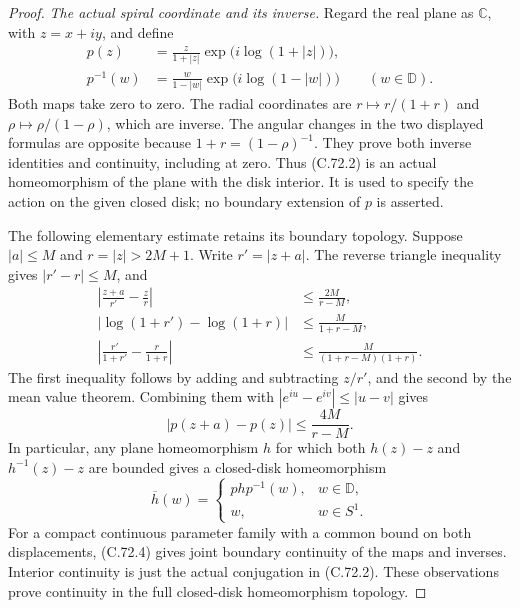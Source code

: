 \begin{proof}
\emph{The actual spiral coordinate and its inverse.}
Regard the real plane as $\mathbb C$, with
$z=x+iy$, and define
\[
 \begin{split}
 p(z)&=\frac{z}{1+|z|}
                \exp\bigl(i\log(1+|z|)\bigr),\\
 p^{-1}(w)&=\frac{w}{1-|w|}
                \exp\bigl(i\log(1-|w|)\bigr)
                            \qquad(w\in\mathbb D).
 \end{split}                                                   \tag{C.72.2}
\]
Both maps take zero to zero. The radial coordinates
are $r\mapsto r/(1+r)$ and
$\rho\mapsto\rho/(1-\rho)$, which are inverse.
The angular changes in the two displayed formulas
are opposite because $1+r=(1-\rho)^{-1}$.
They prove both inverse identities and continuity,
including at zero. Thus (C.72.2) is an actual
homeomorphism of the plane with the disk interior.
It is used to specify the action on the given
closed disk; no boundary extension of $p$ is asserted.

The following elementary estimate retains its boundary
topology. Suppose $|a|\leq M$ and $r=|z|>2M+1$.
Write $r'=|z+a|$. The reverse triangle inequality
gives $|r'-r|\leq M$, and
\[
 \begin{split}
 \left|\frac{z+a}{r'}-\frac z r\right|
                     &\leq\frac{2M}{r-M},\\
 |\log(1+r')-\log(1+r)|
                     &\leq\frac{M}{1+r-M},\\
 \left|\frac{r'}{1+r'}-\frac r{1+r}\right|
                     &\leq\frac{M}{(1+r-M)(1+r)} .
 \end{split}                                                   \tag{C.72.3}
\]
The first inequality follows by adding and subtracting
$z/r'$, and the second by the mean value theorem.
Combining them with $|e^{iu}-e^{iv}|\leq|u-v|$ gives
\[
                       |p(z+a)-p(z)|
                            \leq\frac{4M}{r-M}.
                                                               \tag{C.72.4}
\]
In particular, any plane homeomorphism $h$ for
which both $h(z)-z$ and $h^{-1}(z)-z$ are bounded
gives a closed-disk homeomorphism
\[
 \overline h(w)=
 \begin{cases}
       ph p^{-1}(w),&w\in\mathbb D,\\
       w,&w\in S^1 .
 \end{cases}                                                   \tag{C.72.5}
\]
For a compact continuous parameter family with a
common bound on both displacements, (C.72.4) gives
joint boundary continuity of the maps and inverses.
Interior continuity is just the actual conjugation
in (C.72.2). These observations prove continuity
in the full closed-disk homeomorphism topology.


\end{proof}
